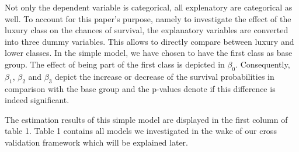 \documentclass[
]{article}
\begin{document}
Not only the dependent variable is categorical, all explenatory are
categorical as well. To account for this paper's purpose, namely to
investigate the effect of the luxury class on the chances of survival,
the explanatory variables are converted into three dummy variables. This
allows to directly compare between luxury and lower classes. In the
simple model, we have chosen to have the first class as base group. The
effect of being part of the first class is depicted in \(\beta_0\).
Consequently, \(\beta_1\), \(\beta_2\) and \(\beta_3\) depict the
increase or decrease of the survival probabilities in comparison with
the base group and the p-values denote if this difference is indeed
significant.

The estimation results of this simple model are displayed in the first
column of table 1. Table 1 contains all models we investigated in the
wake of our cross validation framework which will be explained later.
\end{document}
